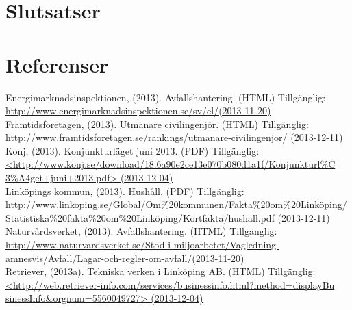 \documentclass[10pt,a4paper]{article}
\begin{document}
\section{Slutsatser}

\newpage
\section{Referenser}


\hspace{0,5cm}Energimarknadsinspektionen, (2013). Avfallshantering. (HTML) Tillgänglig: \\
\hyperref{http://www.energimarknadsinspektionen.se/sv/el/}{}{}{http://www.energimarknadsinspektionen.se/sv/el/(2013-11-20)}\\

Framtidsföretagen, (2013). Utmanare civilingenjör. (HTML) Tillgänglig: \\
http://www.framtidsforetagen.se/rankings/utmanare-civilingenjor/ (2013-12-11)\\

Konj, (2013). Konjunkturläget juni 2013. (PDF) Tillgänglig:\\
\hyperref{http://www.konj.se/download/18.6a90e2ce13e070b080d1a1f/Konjunkturl\%C3\%A4get+juni+2013.pdf}{}{}{<http://www.konj.se/download/18.6a90e2ce13e070b080d1a1f/Konjunkturl\%C\\3\%A4get+juni+2013.pdf> (2013-12-04)}\\

Linköpings kommun, (2013). Hushåll. (PDF) Tillgänglig:\\
http://www.linkoping.se/Global/Om\%20kommunen/Fakta\%20om\%20Linköping/Statistiska\%20fakta\%20om\%20Linköping/Kortfakta/hushall.pdf (2013-12-11)\\

Naturvårdsverket, (2013). Avfallshantering. (HTML) Tillgänglig: \\
\hyperref{http://www.naturvardsverket.se/Stod-i-miljoarbetet/Vagledning-amnesvis/Avfall/Lagar-och-regler-om-avfall/}{}{}{http://www.naturvardsverket.se/Stod-i-miljoarbetet/Vagledning-amnesvis/Avfall/Lagar-och-regler-om-avfall/(2013-11-20)}\\

Retriever, (2013a). Tekniska verken i Linköping AB. (HTML) Tillgänglig: \\
\hyperref{http://web.retriever-info.com/services/businessinfo.html?method=displayBusinessInfo\&orgnum=5560049727}{}{}{<http://web.retriever-info.com/services/businessinfo.html?method=displayBu\\sinessInfo\&orgnum=5560049727> (2013-12-04)}\\
\end{document}
